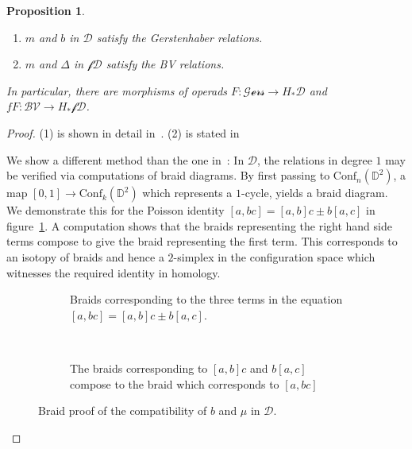 \documentclass{scrartcl}
\theoremstyle{plain}
\newtheorem{proposition}[theorem]{Proposition}
\theoremstyle{definition}
\begin{document}
\begin{proposition}
\begin{enumerate}[(1)]
    \item $m$ and $b$ in $\mathcal{D}$ satisfy the Gerstenhaber relations.
    \item $m$ and $\Delta$ in $\mathcal{fD}$ satisfy the BV relations.
\end{enumerate}
In particular, there are morphisms of operads $F\colon \mathcal{Gers} \to H_*\mathcal D$ and $fF\colon \mathcal{BV} \to H_*\mathcal {fD}$. 
\end{proposition}
\begin{proof}
    (1) is shown in detail in~\cite{sinha2010homology}.
    (2) is stated in~\cite{cohen2006string}

    We show a different method than the one in~\cite{sinha2010homology}: In $\mathcal D$, the relations in degree $1$ may be verified via computations of braid diagrams. By first passing to $\mathrm{Conf}_n(\mathds{D}^2)$, a map $[0,1]\to \mathrm{Conf}_k(\mathds{D}^2)$ which represents a $1$-cycle, yields a braid diagram. We demonstrate this for the Poisson identity $[a, bc] = [a,b]c \pm b[a,c]$ in figure~\ref{gerstenhaber-braid-diagram}. A computation shows that the braids representing the right hand side terms compose to give the braid representing the first term. This corresponds to an isotopy of braids and hence a $2$-simplex in the configuration space which witnesses the required identity in homology.

    \begin{figure}[ht!]
        \centering
        \begin{subfigure}[b]{0.6\textwidth}
            \centering
            
            \caption{Braids corresponding to the three terms in the equation $[a, bc] = [a,b]c \pm b[a,c]$. }
        \end{subfigure} \\[0.5cm]
        \begin{subfigure}[b]{0.6\textwidth}
            \centering
            
            \caption{The braids corresponding to $[a,b]c$ and $b[a,c]$ compose to the braid which corresponds to $[a, bc]$}
        \end{subfigure}
        \caption{Braid proof of the compatibility of $b$ and $\mu$ in $\mathcal D$. }\label{gerstenhaber-braid-diagram}
    \end{figure}
    

\end{proof}
\end{document}
